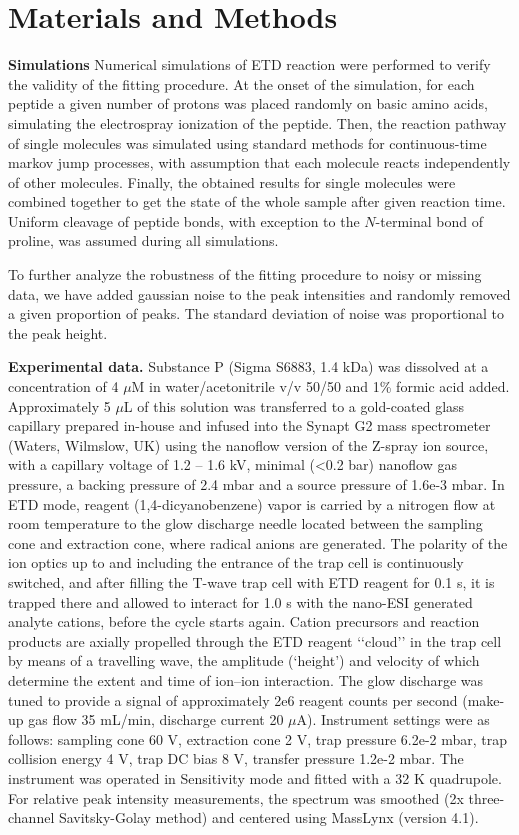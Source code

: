 \documentclass{llncs}
\begin{document}
\section{Materials and Methods}
        \textbf{Simulations} Numerical simulations of ETD reaction were performed to verify the validity of the fitting procedure. At the onset of the simulation, for each peptide a given number of protons was placed randomly on basic amino acids, simulating the electrospray ionization of the peptide. Then, the reaction pathway of single molecules was simulated using standard methods for continuous-time markov jump processes\cite{Gillespie1977}, with assumption that each molecule reacts independently of other molecules. Finally, the obtained results for single molecules were combined together to get the state of the whole sample after given reaction time. Uniform cleavage of peptide bonds, with exception to the $N$-terminal bond of proline, was assumed during all simulations.

        To further analyze the robustness of the fitting procedure to noisy or missing data, we have added gaussian noise to the peak intensities and randomly removed a given proportion of peaks. The standard deviation of noise was proportional to the peak height.

        \textbf{Experimental data.} Substance P (Sigma S6883, 1.4 kDa) was dissolved at a concentration of 4 $\mu$M in water/acetonitrile v/v 50/50 and 1\% formic acid added. Approximately 5 $\mu$L of this solution was transferred to a gold-coated glass capillary prepared in-house and infused into the Synapt G2 mass spectrometer (Waters, Wilmslow, UK) using the nanoflow version of the Z-spray ion source, with a capillary voltage of 1.2 – 1.6 kV, minimal (<0.2 bar) nanoflow gas pressure, a backing pressure of 2.4 mbar and a source pressure of 1.6e-3 mbar. In ETD mode, reagent (1,4-dicyanobenzene) vapor is carried by a nitrogen flow at room temperature to the glow discharge needle located between the sampling cone and extraction cone, where radical anions are generated. The polarity of the ion optics up to and including the entrance of the trap cell is continuously switched, and after filling the T-wave trap cell with ETD reagent for 0.1 s, it is trapped there and allowed to interact for 1.0 s with the nano-ESI generated analyte cations, before the cycle starts again. Cation precursors and reaction products are axially propelled through the ETD reagent ‘‘cloud’’ in the trap cell by means of a travelling wave, the amplitude (‘height’) and velocity of which determine the extent and time of ion–ion interaction. The glow discharge was tuned to provide a signal of approximately 2e6 reagent counts per second (make-up gas flow 35 mL/min, discharge current 20 $\mu$A). Instrument settings were as follows: sampling cone 60 V, extraction cone 2 V, trap pressure 6.2e-2 mbar, trap collision energy 4 V, trap DC bias 8 V, transfer pressure 1.2e-2 mbar. The instrument was operated in Sensitivity mode and fitted with a 32 K quadrupole. For relative peak intensity measurements, the spectrum was smoothed (2x three-channel Savitsky-Golay method) and centered using MassLynx (version 4.1).
\end{document}
